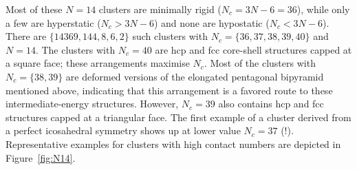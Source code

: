 Most of these $N=14$ clusters are minimally rigid ($N_c=3N-6=36$), while only a
few are hyperstatic ($N_c > 3N-6$) and none are hypostatic ($N_c < 3N-6$).
There are $\{14369,144,8,6,2\}$ such clusters with $N_c=\{36,37,38,39,40\}$ and
$N=14$.  The clusters with $N_c=40$ are hcp and fcc core-shell structures
capped at a square face; these arrangements maximise $N_c$. Most of the
clusters with $N_c=\{38,39\}$ are deformed versions of the elongated pentagonal
bipyramid mentioned above, indicating that this arrangement is a favored route
to these intermediate-energy structures.  However, $N_c=39$ also contains hcp
and fcc structures capped at a triangular face.  The first example of a cluster
derived from a perfect icosahedral symmetry shows up at lower value $N_c=37$
(!).  Representative examples for clusters with high contact numbers are
depicted in Figure~\ref{fig:N14}.  

